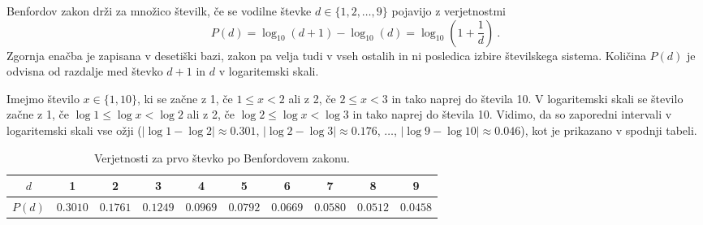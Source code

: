 \documentclass[11pt, oneside]{article}
\theoremstyle{definition}
\begin{document}
Benfordov zakon drži za množico številk, če se vodilne števke $d \in \{1, 2,\ldots,9 \}$ pojavijo z
verjetnostmi
\begin{equation}
    \label{eq: benford}
    P(d) = \log_{10} (d+1) - \log_{10}(d)  = \log_{10} \left ( 1 + \frac{1}{d} \right ) \>.
\end{equation}
Zgornja enačba je zapisana v desetiški bazi, zakon pa velja tudi v vseh ostalih in ni posledica izbire številskega sistema.
Količina $P(d)$ je odvisna od razdalje med števko $d+1$ in $d$ v logaritemski skali.

\newpage

Imejmo število $x \in \{1, 10\}$, ki se začne z 1, če $1 \leq x < 2$ ali z 2, če $2 \leq x < 3$ in tako naprej do števila 10.
V logaritemski skali se število začne z 1, če $\log 1 \leq \log x < \log 2$ ali z 2, če $\log 2 \leq \log x < \log 3$ in tako naprej do števila 10.
Vidimo, da so zaporedni intervali v logaritemski skali vse ožji ($|\log 1 - \log 2| \approx 0.301$, $|\log 2 - \log 3| \approx 0.176$, $\ldots$, $|\log 9 - \log 10| \approx 0.046$),
kot je prikazano v spodnji tabeli.

\begin{table}[h!]
    \begin{center}
        \begin{tabular}{|c|c|c|c|c|c|c|c|c|c|}
            \hline$d$    & 1        & 2        & 3        & 4        & 5        & 6        & 7        & 8        & 9        \\
            \hline$P(d)$ & $0.3010$ & $0.1761$ & $0.1249$ & $0.0969$ & $0.0792$ & $0.0669$ & $0.0580$ & $0.0512$ & $0.0458$ \\
            \hline
        \end{tabular}
    \end{center}
    \caption{Verjetnosti za prvo števko po Benfordovem zakonu.}
    \label{tab: 1}
\end{table}

\end{document}
